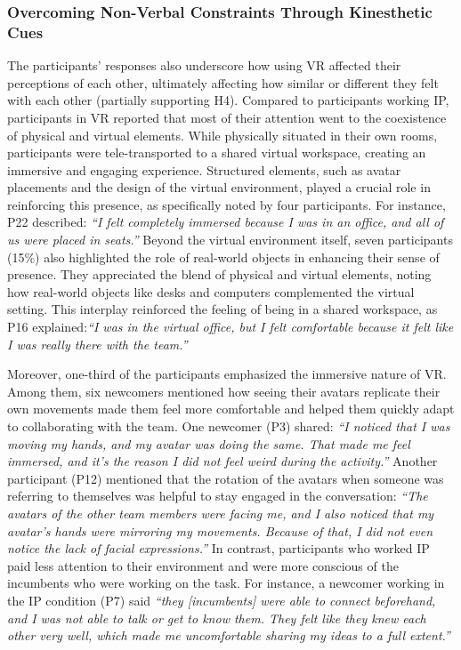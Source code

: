 \subsubsection{Overcoming Non-Verbal Constraints Through Kinesthetic Cues}
The participants' responses also underscore how using VR affected their perceptions of each other, ultimately affecting how similar or different they felt with each other (partially supporting H4). Compared to participants working IP, participants in VR reported that most of their attention went to the coexistence of physical and virtual elements. While physically situated in their own rooms, participants were tele-transported to a shared virtual workspace, creating an immersive and engaging experience. Structured elements, such as avatar placements and the design of the virtual environment, played a crucial role in reinforcing this presence, as specifically noted by four participants. For instance, P22 described: \textit{``I felt completely immersed because I was in an office, and all of us were placed in seats.''} Beyond the virtual environment itself, seven participants (15\%) also highlighted the role of real-world objects in enhancing their sense of presence. They appreciated the blend of physical and virtual elements, noting how real-world objects like desks and computers complemented the virtual setting. This interplay reinforced the feeling of being in a shared workspace, as P16 explained:\textit{``I was in the virtual office, but I felt comfortable because it felt like I was really there with the team.''} 

Moreover, one-third of the participants emphasized the immersive nature of VR. Among them, six newcomers mentioned how seeing their avatars replicate their own movements made them feel more comfortable and helped them quickly adapt to collaborating with the team. One newcomer (P3) shared: \textit{``I noticed that I was moving my hands, and my avatar was doing the same. That made me feel immersed, and it's the reason I did not feel weird during the activity.''} Another participant (P12) mentioned that the rotation of the avatars when someone was referring to themselves was helpful to stay engaged in the conversation: \textit{``The avatars of the other team members were facing me, and I also noticed that my avatar's hands were mirroring my movements. Because of that, I did not even notice the lack of facial expressions.''} In contrast, participants who worked IP paid less attention to their environment and were more conscious of the incumbents who were working on the task. For instance, a newcomer working in the IP condition (P7) said \textit{``they [incumbents] were able to connect beforehand, and I was not able to talk or get to know them. They felt like they knew each other very well, which made me uncomfortable sharing my ideas to a full extent.''}

